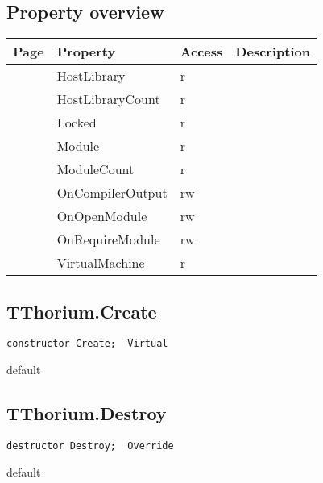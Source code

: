 \subsection{Property overview}
\label{thoriumcore:thorium:tthorium:properties}
\begin{tabularx}{\textwidth}{lllX}
Page & Property & Access & Description \\ \hline
\pageref{thoriumcore:thorium:tthorium:hostlibrary} & HostLibrary & r &  \\
\pageref{thoriumcore:thorium:tthorium:hostlibrarycount} & HostLibraryCount & r &  \\
\pageref{thoriumcore:thorium:tthorium:locked} & Locked & r &  \\
\pageref{thoriumcore:thorium:tthorium:module} & Module & r &  \\
\pageref{thoriumcore:thorium:tthorium:modulecount} & ModuleCount & r &  \\
\pageref{thoriumcore:thorium:tthorium:oncompileroutput} & OnCompilerOutput & rw &  \\
\pageref{thoriumcore:thorium:tthorium:onopenmodule} & OnOpenModule & rw &  \\
\pageref{thoriumcore:thorium:tthorium:onrequiremodule} & OnRequireModule & rw &  \\
\pageref{thoriumcore:thorium:tthorium:virtualmachine} & VirtualMachine & r &  \\
\hline
\end{tabularx}
\subsection{TThorium.Create}
\label{thoriumcore:thorium:tthorium:create}
\begin{FPCList}
\Synopsis
\Declaration 

\begin{verbatim}
constructor Create;  Virtual
\end{verbatim}
\Visibility
default
\Description
\Errors
\end{FPCList}
\subsection{TThorium.Destroy}
\label{thoriumcore:thorium:tthorium:destroy}
\begin{FPCList}
\Synopsis
\Declaration 

\begin{verbatim}
destructor Destroy;  Override
\end{verbatim}
\Visibility
default
\Description
\Errors
\end{FPCList}
